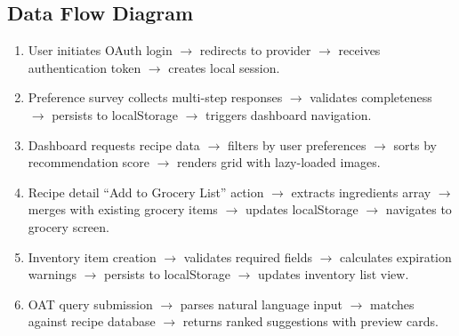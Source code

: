 \documentclass[12pt]{article}
\begin{document}
\subsection{Data Flow Diagram}
\begin{enumerate}
  \item User initiates OAuth login $\rightarrow$ redirects to provider $\rightarrow$ receives authentication token $\rightarrow$ creates local session.
  \item Preference survey collects multi-step responses $\rightarrow$ validates completeness $\rightarrow$ persists to localStorage $\rightarrow$ triggers dashboard navigation.
  \item Dashboard requests recipe data $\rightarrow$ filters by user preferences $\rightarrow$ sorts by recommendation score $\rightarrow$ renders grid with lazy-loaded images.
  \item Recipe detail ``Add to Grocery List'' action $\rightarrow$ extracts ingredients array $\rightarrow$ merges with existing grocery items $\rightarrow$ updates localStorage $\rightarrow$ navigates to grocery screen.
  \item Inventory item creation $\rightarrow$ validates required fields $\rightarrow$ calculates expiration warnings $\rightarrow$ persists to localStorage $\rightarrow$ updates inventory list view.
  \item OAT query submission $\rightarrow$ parses natural language input $\rightarrow$ matches against recipe database $\rightarrow$ returns ranked suggestions with preview cards.
\end{enumerate}
\end{document}
